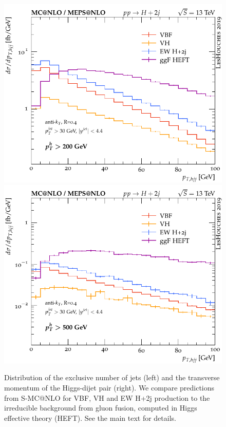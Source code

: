 \documentclass[10pt,prd,fleqn,superscriptaddress,notitlepage,nofootinbib,preprintnumbers,nobalancelastpage]{revtex4-1}
\begin{document}
\begin{figure}[p]
\begin{minipage}{.45\textwidth}
    \includegraphics[width=\textwidth]{figures/channels/pthjj12_pth200.pdf}
    \includegraphics[width=\textwidth]{figures/channels/pthjj12_pth500.pdf}
  \end{minipage}
\caption{Distribution of the exclusive number of jets (left) and the transverse momentum of the Higgs-dijet pair (right).
We compare predictions from S-MC@NLO for VBF, VH and EW H+2j production to the irreducible background
from gluon fusion, computed in Higgs effective theory (HEFT). See the main text for details.}
\label{fig:incl_njets}
\end{figure}
\end{document}
